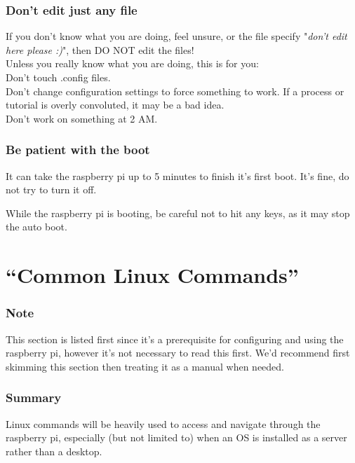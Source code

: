 \documentclass[a4paper, 10pt]{article}
\begin{document}
            \subsubsection{Don't edit just any file}
            If you don't know what you are doing, feel unsure, or the file specify "\textit{don't edit here please :)}", then DO NOT edit the files!\\

            Unless you really know what you are doing, this is for you:\\
            Don't touch .config files.\\
            Don't change configuration settings to force something to work. If a process or tutorial is overly convoluted, it may be a bad idea.\\
            Don't work on something at 2 AM.

            \subsubsection{Be patient with the boot}
            It can take the raspberry pi up to 5 minutes to finish it's first boot. It's fine, do not try to turn it off.

            While the raspberry pi is booting, be careful not to hit any keys, as it may stop the auto boot.

 

 \pagebreak


\section{``Common Linux Commands''}
		\subsubsection*{Note}
		This section is listed first since it's a prerequisite for           configuring and using the raspberry pi, however it's not             necessary to read this first.
            We'd recommend first skimming this section then treating it as a manual when needed.

            \subsubsection*{Summary}
            Linux commands will be heavily used to access and navigate through the raspberry pi, especially (but not limited to) when an OS is installed as a server rather than a desktop.
	
\end{document}
